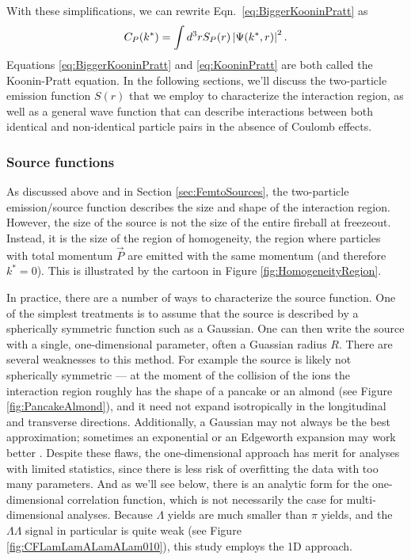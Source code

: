 
With these simplifications, we can rewrite Eqn.\ \ref{eq:BiggerKooninPratt} as 
\begin{equation}
\label{eq:KooninPratt}
C_P(k^*) =  \int d^3r S_{P} (r) \left\lvert\Psi(k^*,r)\right\rvert^2.
\end{equation}
Equations \ref{eq:BiggerKooninPratt} and \ref{eq:KooninPratt} are both called the Koonin-Pratt equation. 
In the following sections, we'll discuss the two-particle emission function $S(r)$ that we employ to characterize the interaction region, as well as a general wave function that can describe interactions between both identical and non-identical particle pairs in the absence of Coulomb effects.

\subsubsection{Source functions}
\label{sec:SourceFunctions}

As discussed above and in Section \ref{sec:FemtoSources}, the two-particle emission/source function describes the size and shape of the interaction region.
However, the size of the source is not the size of the entire fireball at freezeout.
Instead, it is the size of the region of homogeneity, the region where particles with total momentum $\vec{P}$ are emitted with the same momentum (and therefore $k^* = 0$).
This is illustrated by the cartoon in Figure \ref{fig:HomogeneityRegion}.

In practice, there are a number of ways to characterize the source function.
One of the simplest treatments is to assume that the source is described by a spherically symmetric function such as a Gaussian.
One can then write the source with a single, one-dimensional parameter, often a Guassian radius $R$.
There are several weaknesses to this method.
For example the source is likely not spherically symmetric --- at the moment of the collision of the ions the interaction region roughly has the shape of a pancake or an almond (see Figure \ref{fig:PancakeAlmond}), and it need not expand isotropically in the longitudinal and transverse directions.
Additionally, a Gaussian may not always be the best approximation; sometimes an exponential or an Edgeworth expansion may work better \cite{Abelev:2014pja}.
Despite these flaws, the one-dimensional approach has merit for analyses with limited statistics, since there is less risk of overfitting the data with too many parameters.
And as we'll see below, there is an analytic form for the one-dimensional correlation function, which is not necessarily the case for multi-dimensional analyses.
Because $\Lambda$ yields are much smaller than $\pi$ yields, and the $\Lambda\Lambda$ signal in particular is quite weak (see Figure \ref{fig:CFLamLamALamALam010}), this study employs the 1D approach.

